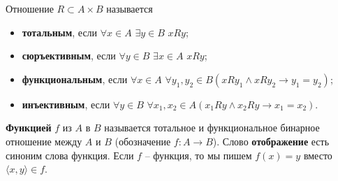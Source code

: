 \begin{definition}Отношение $R \subset A \times B$ называется
	\begin{itemize}
		\item \textbf{тотальным}, если $ \forall x \in A$ $\exists y \in B$ $xRy$;

		\item \textbf{сюръективным}, если $ \forall y \in B$ $\exists x \in A$ $xRy$;

		\item \textbf{функциональным}, если $ \forall x \in A$ $\forall y_1, y_2 \in B (xRy_1 \land xRy_2 \rightarrow
			y_1 = y_2)$;

		\item \textbf{инъективным}, если $ \forall y \in B$ $\forall x_1, x_2 \in A (x_1 Ry \land x_2 Ry \rightarrow
			x_1 = x_2)$.
	\end{itemize}
	\textbf{Функцией} $f$ из $A$ в $B$ называется тотальное и функциональное бинарное отношение между $A$ и $B$
	(обозначение $f : A \rightarrow B$). Слово \textbf{отображение} есть синоним слова функция. Если $f$ -- функция, то
	мы пишем $f (x) = y$ вместо $\langle x, y \rangle \in f$.
\end{definition}
